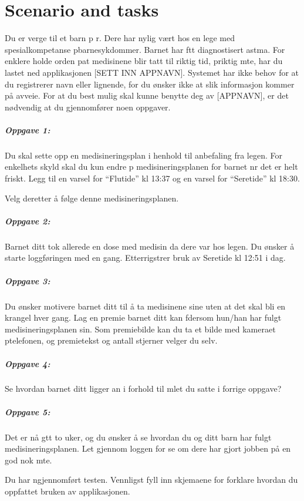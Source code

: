 \chapter{Scenario and tasks}
\label{app:scenarioandtasks}


Du er verge til et barn p \a r. Dere har nylig v\ae rt hos en lege med spesialkompetanse p\a barnesykdommer.
Barnet har f\a tt diagnostisert astma. For \a enklere holde orden p\a at medisinene blir tatt til riktig tid, p\a riktig m\a te, 
har du lastet ned applikasjonen [SETT INN APPNAVN]. Systemet har ikke behov for at du registrerer navn eller lignende, 
for du \o nsker ikke at slik informasjon kommer på avveie. For at du best mulig skal kunne benytte deg av [APPNAVN], er det
n\o dvendig at du gjennomf\o rer noen oppgaver.

\paragraph{Oppgave 1:}
Du skal sette opp en medisineringsplan i henhold til anbefaling fra legen. For enkelhets skyld skal du kun endre p\a
medisineringsplanen for barnet n\a r det er helt friskt. Legg til en varsel for ``Flutide'' kl 13:37 og en varsel for ``Seretide'' kl 18:30.

Velg deretter å f\o lge denne medisineringsplanen.


\paragraph{Oppgave 2:}
Barnet ditt tok allerede en dose med medisin da dere var hos legen. Du \o nsker å starte loggf\o ringen med en gang. Etterrigstrer bruk
av Seretide kl 12:51 i dag.


\paragraph{Oppgave 3:}
Du \o nsker \a motivere barnet ditt til å ta medisinene sine uten at det skal bli en krangel hver gang.
Lag en premie barnet ditt kan f\a dersom hun/han har fulgt medisineringsplanen sin.
Som premiebilde kan du ta et bilde med kameraet p\a telefonen, og premietekst og antall stjerner velger du selv.


\paragraph{Oppgave 4:}
Se hvordan barnet ditt ligger an i forhold til m\a let du satte i forrige oppgave?


\paragraph{Oppgave 5:}
Det er nå g\a tt to uker, og du \o nsker å se hvordan du og ditt barn har fulgt medisineringsplanen. 
Let gjennom loggen for \a se om dere har gjort jobben på en god nok m\a te.



Du har n\a gjennomf\o rt testen. Vennligst fyll inn skjemaene for \a forklare hvordan du oppfattet bruken av applikasjonen.